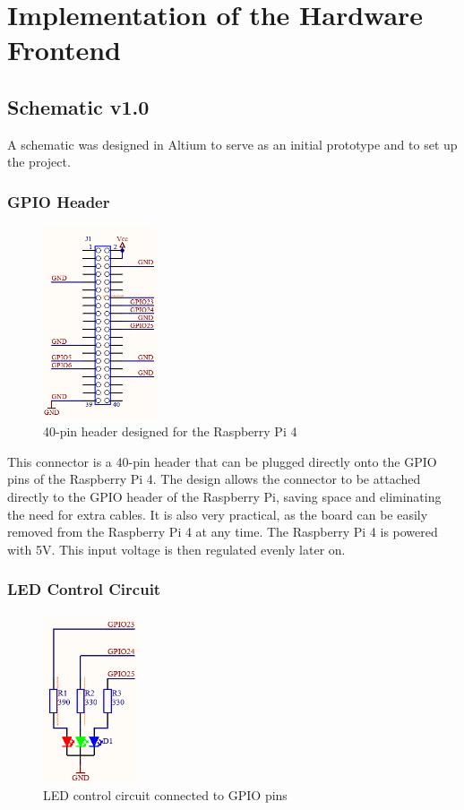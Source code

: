 \cleardoubleemptypage
\renewcommand*\chapterpagestyle{scrheadings}

\chapter{Implementation of the Hardware Frontend}

\section{Schematic v1.0}
A schematic was designed in Altium to serve as an initial prototype and to set up the project.
\subsection{GPIO Header}

\begin{figure}[H]
  \centering
  \includegraphics[width=0.3\textwidth]{assets/Stecker}
  \caption{40-pin header designed for the Raspberry Pi 4}
\end{figure}

This connector is a 40-pin header that can be plugged directly onto the GPIO pins of the Raspberry Pi 4.
The design allows the connector to be attached directly to the GPIO header of the Raspberry Pi, saving space and eliminating the need for extra cables. It is also very practical, as the board can be easily removed from the Raspberry Pi 4 at any time.
The Raspberry Pi 4 is powered with 5V. This input voltage is then regulated evenly later on.

\subsection{LED Control Circuit}

\begin{figure}[H]
  \centering
  \includegraphics[width=0.25\textwidth]{assets/RGB}
  \caption{LED control circuit connected to GPIO pins}
\end{figure}

